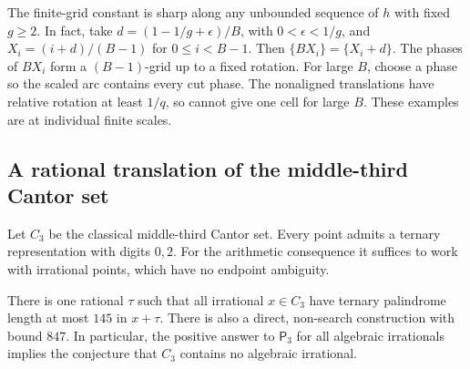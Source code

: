 The finite-grid constant is sharp along any unbounded sequence of $h$ with fixed $g\ge2$. In fact, take $d=(1-1/g+\epsilon)/B$, with $0<\epsilon<1/g$, and $X_i=(i+d)/(B-1)$ for $0\le i<B-1$. Then $\{BX_i\}=\{X_i+d\}$. The phases of $BX_i$ form a $(B-1)$-grid up to a fixed rotation. For large $B$, choose a phase so the scaled arc contains every cut phase. The nonaligned translations have relative rotation at least $1/q$, so cannot give one cell for large $B$. These examples are at individual finite scales.

\subsection{A rational translation of the middle-third Cantor set}
Let $C_3$ be the classical middle-third Cantor set. Every point admits a ternary representation with digits $0,2$. For the arithmetic consequence it suffices to work with irrational points, which have no endpoint ambiguity.

\begin{theorem}\label{thm:cantor}
There is one rational $\tau$ such that all irrational $x\in C_3$ have ternary palindrome length at most $145$ in $x+\tau$. There is also a direct, non-search construction with bound $847$. In particular, the positive answer to $\mathsf P_3$ for all algebraic irrationals implies the conjecture that $C_3$ contains no algebraic irrational.
\end{theorem}

